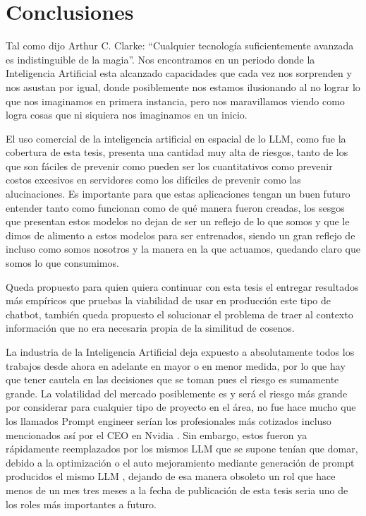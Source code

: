 
\chapter{Conclusiones}

\par Tal como dijo Arthur C. Clarke: ``Cualquier tecnología suficientemente avanzada es indistinguible de la magia''. Nos encontramos 
en un periodo donde la Inteligencia Artificial esta alcanzado capacidades que cada vez nos sorprenden y nos asustan por igual, donde 
posiblemente nos estamos ilusionando al no lograr lo que nos imaginamos en primera instancia, pero nos maravillamos viendo como logra 
cosas que ni siquiera nos imaginamos en un inicio.  

\par El uso comercial de la inteligencia artificial en espacial de lo LLM, como fue la cobertura de esta tesis, presenta una cantidad 
muy alta de riesgos, tanto de los que son fáciles de prevenir como pueden ser los cuantitativos como prevenir costos excesivos en 
servidores como los difíciles de prevenir como las alucinaciones.  Es importante para que estas aplicaciones tengan un buen futuro 
entender tanto como funcionan como de qué manera fueron creadas, los sesgos que presentan estos modelos no dejan de ser un reflejo
de lo que somos y que le dimos de alimento a estos modelos para ser entrenados, siendo un gran reflejo de incluso como somos nosotros 
y la manera en la que actuamos, quedando claro que somos lo que consumimos. 

\par Queda propuesto para quien quiera continuar con esta tesis el entregar resultados más empíricos que pruebas la viabilidad de 
usar en producción este tipo de chatbot, también queda propuesto el solucionar el problema de traer al contexto información que no 
era necesaria propia de la similitud de cosenos. 

\par La industria de la Inteligencia Artificial deja expuesto a absolutamente todos los trabajos desde ahora en adelante en mayor 
o en menor medida, por lo que hay que tener cautela en las decisiones que se toman pues el riesgo es sumamente grande. La 
volatilidad del mercado posiblemente es y será el riesgo más grande por considerar para cualquier tipo de proyecto en el área, 
no fue hace mucho que los llamados Prompt engineer serían los profesionales más cotizados incluso mencionados así por el CEO en 
Nvidia \cite{conclusion1}. Sin embargo, estos fueron ya rápidamente reemplazados por los mismos LLM que se supone tenían que domar, debido a la optimización \cite{conclusion2}
o el auto mejoramiento mediante generación de prompt producidos el mismo LLM \cite{conclusion3}, dejando de esa manera obsoleto un rol que hace menos de 
un mes tres meses a la fecha de publicación de esta tesis seria uno de los roles más importantes a futuro.

